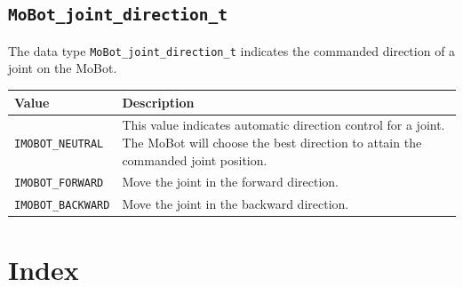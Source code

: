 \documentclass{article}
\begin{document}
\subsection{\texttt{MoBot\_joint\_direction\_t}}
The data type \texttt{MoBot\_joint\_direction\_t} indicates the commanded direction 
of a joint on the MoBot.

\begin{tabular}{p{3cm}p{7cm}} \hline 
Value & Description \\
\hline 
\texttt{IMOBOT\_NEUTRAL} & This value indicates automatic direction control for a joint. 
The MoBot will choose the best direction to attain the commanded joint position. \\
\texttt{IMOBOT\_FORWARD} & Move the joint in the forward direction. \\
\texttt{IMOBOT\_BACKWARD} & Move the joint in the backward direction. \\
\end{tabular}
\section{Index}
\printindex
\end{document}
